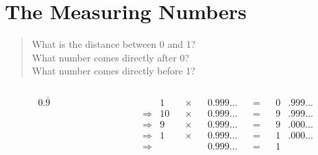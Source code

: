 \documentclass{beamer}
\begin{document}
\section{The Measuring Numbers}


\begin{frame}
  \begin{adjustbox}{max totalsize={0.9\textwidth}{\baselineskip}, keepaspectratio, center}
  \end{adjustbox}
\end{frame}


\begin{frame}[standout]
  \begin{quote}
    What is the distance between 0 and 1? \\[8mm]
    What number comes directly after 0? \\[8mm]
    What number comes directly before 1? \\[8mm]
  \end{quote}
\end{frame}


\begin{frame}
  \begin{columns}
    \begin{column}{0.3\textwidth}
      \color{gmitblue} \fontsize{60}{70}
      \[0.\bar{9}\]
    \end{column}
    {\color{gmitgrey!30}\vrule{}} \hspace{0.01\textwidth}
    \begin{column}{0.5\textwidth}
      \begin{align*}
        &            &  1& &\times && 0.999\ldots & &= & &0&.999\ldots\\[4mm]
        & \Rightarrow& 10& &\times && 0.999\ldots & &= & &9&.999\ldots\\[4mm]
        & \Rightarrow&  9& &\times && 0.999\ldots & &= & &9&.000\ldots\\[4mm]
        & \Rightarrow&  1& &\times && 0.999\ldots & &= & &1&.000\ldots\\[4mm]
        & \Rightarrow&   & &       && 0.999\ldots & &= & &1& \\[4mm]
      \end{align*}
    \end{column}
  \end{columns}
\end{frame}
\end{document}
